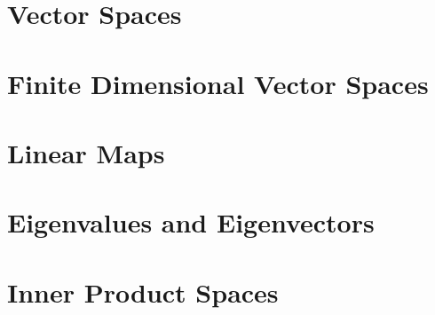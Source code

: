 \documentclass[draft]{report}
\begin{document}
  

  \chapter{Vector Spaces}
  
  
  \filbreak
  

  \chapter{Finite Dimensional Vector Spaces}
  
  
  

  \chapter{Linear Maps}
  
  
  
  
  
  

  

  \chapter{Eigenvalues and Eigenvectors}
  

  \chapter{Inner Product Spaces}
  
  
  
\end{document}
